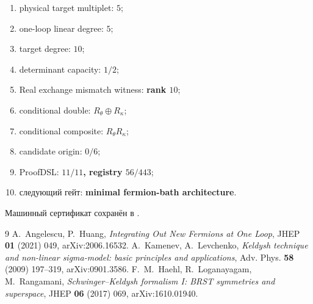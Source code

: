 \begin{protocol}\begin{enumerate}
\item physical target multiplet: \textbf{$5$};
\item one-loop linear degree: \textbf{$5$};
\item target degree: \textbf{$10$};
\item determinant capacity: \textbf{$1/2$};
\item Real exchange mismatch witness: \textbf{rank $10$};
\item conditional double: \textbf{$R_\theta\oplus R_\kappa$};
\item conditional composite: \textbf{$R_\theta R_\kappa$};
\item candidate origin: \textbf{$0/6$};
\item ProofDSL: \textbf{$11/11$, registry $56/443$};
\item следующий гейт: \textbf{minimal fermion-bath architecture}.
\end{enumerate}\end{protocol}

Машинный сертификат сохранён в
.

\begin{thebibliography}{9}
A.~Angelescu, P.~Huang,
\emph{Integrating Out New Fermions at One Loop},
JHEP \textbf{01} (2021) 049, arXiv:2006.16532.
A.~Kamenev, A.~Levchenko,
\emph{Keldysh technique and non-linear sigma-model: basic principles and
applications}, Adv. Phys. \textbf{58} (2009) 197--319,
arXiv:0901.3586.
F.~M.~Haehl, R.~Loganayagam, M.~Rangamani,
\emph{Schwinger--Keldysh formalism I: BRST symmetries and superspace},
JHEP \textbf{06} (2017) 069, arXiv:1610.01940.
\end{thebibliography}